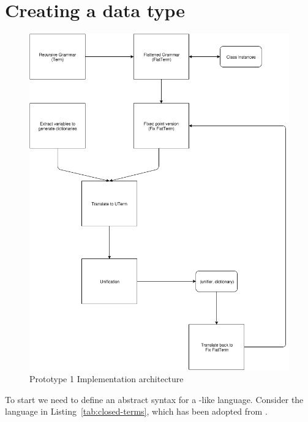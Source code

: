 \documentclass[thesis-solanki.tex]{subfiles}
\begin{document}
\section{Creating a data type}
\begin{figure}
  \includegraphics[width=1\textwidth]{prototype_1_implementation_architecture.png}
  \caption{Prototype 1 Implementation architecture}
  \label{fig:proto1-impl-arch}
\end{figure}

To start we need to define an abstract syntax for a -like language.
Consider the language in Listing~\ref{tab:closed-terms}, which has been adopted from
\cite{prolog-lib}.

\begin{code-list}[H]
\begin{singlespace}
\inputminted{haskell}{haskell-proto1-closed-terms.hs}
\end{singlespace}
  \caption{A classic recursive grammar}
  \label{tab:closed-terms}
\end{code-list}
\end{document}
